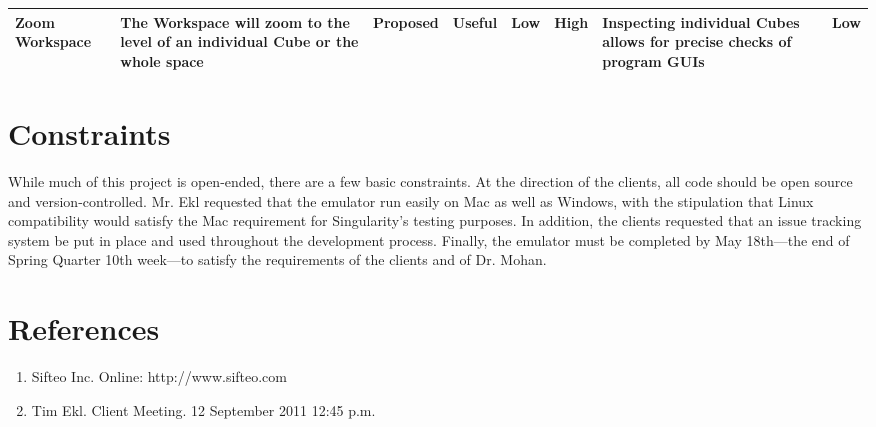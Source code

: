 \documentclass[12pt]{article}
\begin{document}
\begin{landscape}
\begin{table}[h]
\begin{tabular}{p{1.5in} | p{1.75in} | p{.75in} | p{.75in} | p{.75in} | p{.75in} | p{1.75in} | p{.6in}}
        Zoom Workspace &
        The Workspace will zoom to the level of an individual Cube or the whole space &
        Proposed &
        Useful &
        Low &
        High &
        Inspecting individual Cubes allows for precise checks of program GUIs &
        Low \\ \hline

      \end{tabular}
    \end{table}
    \end{landscape}

\section{Constraints}
        While much of this project is open-ended, there are a few basic constraints. At the direction of the clients, all code should be \gls{open source} and version-controlled. Mr. Ekl requested that the emulator run easily on \gls{Mac} as well as \gls{Windows}, with the stipulation that \gls{Linux} compatibility would satisfy the \gls{Mac} requirement for Singularity's testing purposes. In addition, the clients requested that an issue tracking system be put in place and used throughout the development process. Finally, the emulator must be completed by May 18th---the end of Spring Quarter 10th week---to satisfy the requirements of the clients and of Dr. Mohan.

\clearpage
{}
\printglossaries
\clearpage

\section*{References}

        \begin{enumerate}
                \item{Sifteo Inc. Online: http://www.sifteo.com}
                \item{Tim Ekl.  Client Meeting.  12 September 2011 12:45 p.m.}
        \end{enumerate}

\printindex
\end{document}
